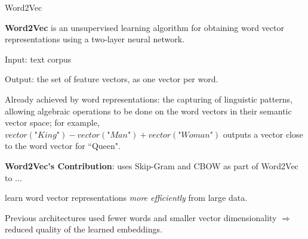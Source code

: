 \begin{frame}{Word2Vec}
    \begin{itemizeSpaced}{10pt}
        \pinkbox \textbf{Word2Vec} is an unsupervised learning algorithm for obtaining word vector representations using a two-layer neural network. 
        \begin{itemizeSpaced}{2pt}
            \item Input: text corpus
            \item Output: the set of feature vectors, as one vector per word.
        \end{itemizeSpaced}
        
        \item Already achieved by word representations: the capturing of linguistic patterns, allowing algebraic operations to be done on the word vectors in their semantic vector space; for example, $vector(\textit{"King"}) - vector(\textit{"Man"}) + vector(\textit{"Woman"})$ outputs a vector close to the word vector for ``Queen". 
        
        \pinkbox \textbf{Word2Vec's Contribution}: uses Skip-Gram and CBOW as part of Word2Vec to ...
        
        \begin{itemizeSpaced}{2pt}
            \item learn word vector representations \emph{more efficiently} from large data. 
            
            \item Previous architectures used fewer words and smaller vector dimensionality $\Rightarrow$ reduced quality of the learned embeddings. 
        \end{itemizeSpaced}
        
        
    \end{itemizeSpaced}
\end{frame}



